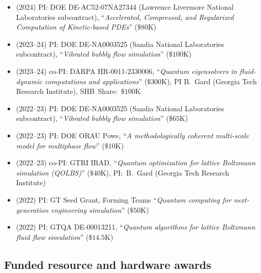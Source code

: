 \begin{itemize}
    \item (2024) PI: DOE DE-AC52-07NA27344 (Lawrence Livermore National Laboratories subcontract), ``\textit{Accelerated, Compressed, and Regularized Computation of Kinetic-based PDEs}'' ($\$80$K)
    \item (2023--24) PI: DOE DE-NA0003525 (Sandia National Laboratories subcontract), ``\textit{Vibrated bubbly flow simulation}'' ($\$100$K)
    \item (2023--24) co-PI: DARPA HR-0011-2330006, ``\textit{Quantum eigensolvers in fluid-dynamic computations and applications}'' ($\$300$K), PI B.~Gard (Georgia Tech Research Institute), SHB~Share:~$\$100$K
    \item (2022--23) PI: DOE DE-NA0003525 (Sandia National Laboratories subcontract), ``\textit{Vibrated bubbly flow simulation}'' ($\$65$K)
    \item (2022--23) PI: DOE ORAU Powe, ``\textit{A methodologically coherent multi-scale model for multiphase flow}'' ($\$10$K)
    \item (2022--23) co-PI: GTRI IRAD, ``\textit{Quantum optimization for lattice Boltzmann simulation (QOLBS)}'' ($\$40$K), PI:~B.~Gard (Georgia Tech Research Institute)
    \item (2022) PI: GT Seed Grant, Forming Teams ``\textit{Quantum computing for next-generation engineering simulation}'' ($\$50$K)
    \item (2022) PI: GTQA DE-00013211, ``\textit{Quantum algorithms for lattice Boltzmann fluid flow simulation}'' ($\$14.5$K)
\end{itemize}

\subsection{Funded resource and hardware awards}

